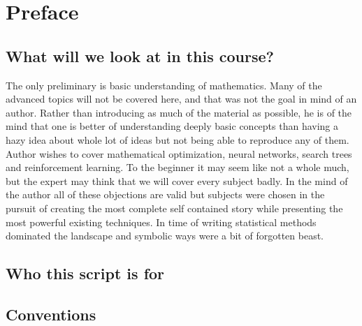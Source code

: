 \thispagestyle{empty}

\chapter*{Preface}


\section*{What will we look at in this course?}


\noindent The only preliminary is basic understanding of mathematics. Many of the advanced topics will not be covered here, and that was not the goal in mind of an author. Rather than introducing as much of the material as possible, he is of the mind that one is better of understanding deeply basic concepts than having a hazy idea about whole lot of ideas but not being able to reproduce any of them. Author wishes to cover mathematical optimization, neural networks, search trees and reinforcement learning. To the beginner it may seem like not a whole much, but the expert may think that we will cover every subject badly. In the mind of the author all of these objections are valid but subjects were chosen in the pursuit of creating the most complete self contained story while presenting the most powerful existing techniques. In time of writing statistical methods dominated the landscape and symbolic ways were a bit of forgotten beast.


\section*{Who this script is for}




\section*{Conventions}



%
